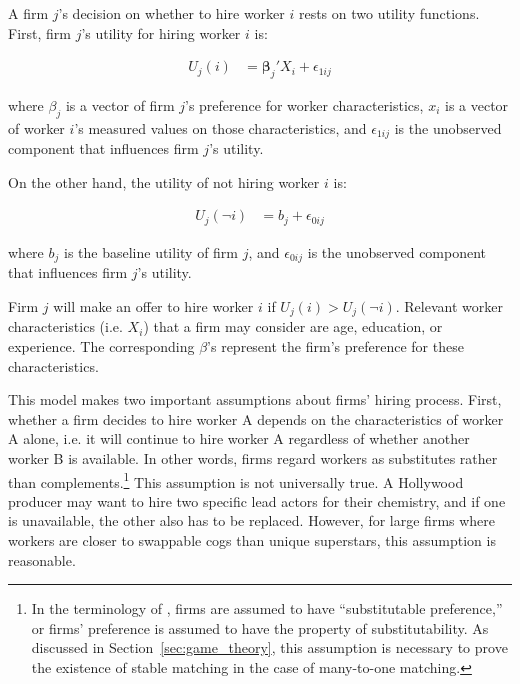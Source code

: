 A firm $j$'s decision on whether to hire worker $i$ rests on two utility
functions. First, firm $j$'s utility for hiring worker $i$ is:

\begin{align}
  U_j(i) &= \bm{\beta}_j' X_i + \epsilon_{1ij}
\end{align}

where $\beta_j$ is a vector of firm $j$'s preference for worker characteristics,
$x_i$ is a vector of worker $i$'s measured values on those characteristics, and
$\epsilon_{1ij}$ is the unobserved component that influences firm $j$'s utility.

On the other hand, the utility of not hiring worker $i$ is:

\begin{align}
  U_j(\neg i) &= b_j + \epsilon_{0ij}
\end{align}

where $b_j$ is the baseline utility of firm $j$, and $\epsilon_{0ij}$ is the
unobserved component that influences firm $j$'s utility.

Firm $j$ will make an offer to hire worker $i$ if $U_j(i) > U_j(\neg i)$.
Relevant worker characteristics (i.e. $X_i$) that a firm may consider are age,
education, or experience. The corresponding $\beta$'s represent the firm's
preference for these characteristics.

This model makes two important assumptions about firms' hiring process. First,
whether a firm decides to hire worker A depends on the characteristics of worker
A alone, i.e. it will continue to hire worker A regardless of whether another
worker B is available. In other words, firms regard workers as substitutes
rather than complements.\footnote{In the terminology of \citet{Roth1992}, firms
  are assumed to have ``substitutable preference,'' or firms' preference is
  assumed to have the property of substitutability. As discussed in
  Section~\ref{sec:game_theory}, this assumption is necessary to prove the
  existence of stable matching in the case of many-to-one matching.} This
assumption is not universally true. A Hollywood producer may want to hire two
specific lead actors for their chemistry, and if one is unavailable, the other
also has to be replaced. However, for large firms where workers are closer to
swappable cogs than unique superstars, this assumption is reasonable.

